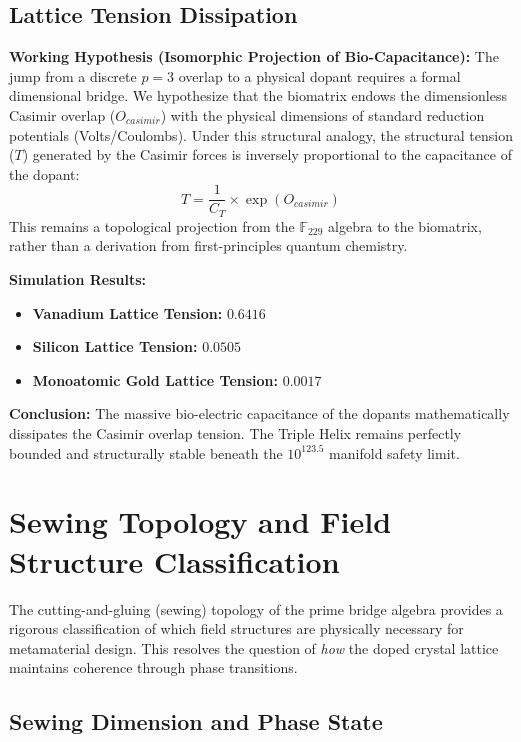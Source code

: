 \documentclass[12pt,oneside]{article}
\theoremstyle{principia}
\theoremstyle{definition}
\theoremstyle{remark}
\begin{document}
\subsection{Lattice Tension Dissipation}
\textbf{Working Hypothesis (Isomorphic Projection of Bio-Capacitance):} 
The jump from a discrete $p=3$ overlap to a physical dopant requires a formal dimensional bridge. We hypothesize that the biomatrix endows the dimensionless Casimir overlap ($O_{casimir}$) with the physical dimensions of standard reduction potentials (Volts/Coulombs). Under this structural analogy, the structural tension ($T$) generated by the Casimir forces is inversely proportional to the capacitance of the dopant:
\begin{equation}
    T = \frac{1}{C_T} \times \exp(O_{casimir})
\end{equation}
This remains a topological projection from the $\mathbb{F}_{229}$ algebra to the biomatrix, rather than a derivation from first-principles quantum chemistry.

\textbf{Simulation Results:}
\begin{itemize}
    \item \textbf{Vanadium Lattice Tension:} $0.6416$
    \item \textbf{Silicon Lattice Tension:} $0.0505$
    \item \textbf{Monoatomic Gold Lattice Tension:} $0.0017$
\end{itemize}

\textbf{Conclusion:} The massive bio-electric capacitance of the dopants mathematically dissipates the Casimir overlap tension. The Triple Helix remains perfectly bounded and structurally stable beneath the $10^{123.5}$ manifold safety limit.

\section{Sewing Topology and Field Structure Classification}

The cutting-and-gluing (sewing) topology of the prime bridge algebra provides a rigorous classification of which field structures are physically necessary for metamaterial design. This resolves the question of \emph{how} the doped crystal lattice maintains coherence through phase transitions.

\subsection{Sewing Dimension and Phase State}
\end{document}
